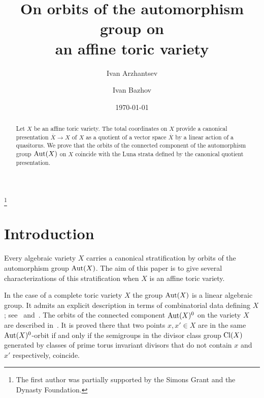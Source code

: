 \documentclass[12pt,a4paper]{amsart}
\theoremstyle{plain}
\theoremstyle{definition}
\begin{document}
\sloppy
\title[Automorphisms of affine toric varieties]
{On orbits of the automorphism group on \\ an affine toric variety}
\author{Ivan Arzhantsev}
\thanks{The first author was partially supported by the Simons Grant and the Dynasty Foundation.}
\address{Department of Higher Algebra, Faculty of Mechanics and Mathematics,
Moscow State University, Leninskie Gory 1, GSP-1, Moscow, 119991,
Russia } 
\author{Ivan Bazhov}
\address{Department of Higher Algebra, Faculty of Mechanics and Mathematics,
Moscow State University, Leninskie Gory 1, GSP-1, Moscow, 119991,
Russia } 
\date{\today}
\begin{abstract}
Let $X$ be an affine toric variety. The total coordinates on $X$
provide a canonical presentation $\overline{X} \to X$ of $X$
as a quotient of a vector space $\overline{X}$
by a linear action of a quasitorus.
We prove that the orbits of the connected component
of the automorphism group ${\mathop{\rm Aut}}(X)$ on $X$ coincide with the Luna strata
defined by the canonical quotient presentation.
\end{abstract}
\maketitle
\section*{Introduction}

Every algebraic variety $X$ carries a canonical stratification by orbits of the automorphism
group ${\mathop{\rm Aut}}(X)$. The aim of this paper is to give several characterizations of this stratification
when $X$ is an affine toric variety.

In the case of a complete toric variety $X$ the group ${\mathop{\rm Aut}}(X)$ is a linear algebraic group.
It admits an explicit description in terms of combinatorial data defining $X$; see~\cite{De}
and~\cite{Cox}. The orbits of the connected component ${\mathop{\rm Aut}}(X)^0$ on the variety $X$
are described in~\cite{Ba}. It is proved there that two points $x,x'\in X$ are in the same
${\mathop{\rm Aut}}(X)^0$-orbit if and only if the semigroups in the divisor class group ${\mathop{\rm Cl}}(X)$
generated by classes of prime torus invariant divisors that do not contain $x$ and $x'$
respectively, coincide.
\end{document}
